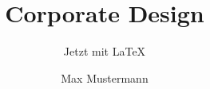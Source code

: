 \documentclass{beamer}
\begin{document}
\title{Corporate Design}
\subtitle{Jetzt mit \LaTeX}
\author{Max Mustermann}
\titlegraphic{\tuDefaultTitlegraphic}

\begin{frame}[plain]
  \titlepage
\end{frame}
\end{document}
